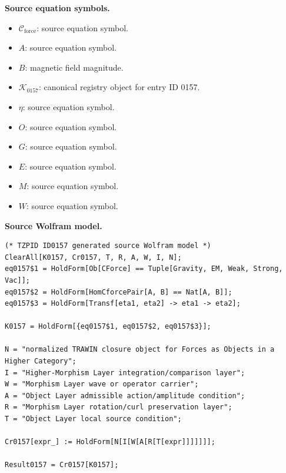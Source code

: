 \begin{minipage}[t]{0.49\linewidth}
\begingroup
\small
\raggedright
\textbf{Source equation symbols.}\par
\begin{itemize}[leftmargin=1.35em,itemsep=1pt,topsep=1pt,parsep=0pt]
    \item $\mathcal{C}_{\mathrm{force}}$: source equation symbol.
    \item $A$: source equation symbol.
    \item $B$: magnetic field magnitude.
    \item $\mathcal{K}_{0157}$: canonical registry object for entry ID 0157.
    \item $\eta$: source equation symbol.
    \item $O$: source equation symbol.
    \item $G$: source equation symbol.
    \item $E$: source equation symbol.
    \item $M$: source equation symbol.
    \item $W$: source equation symbol.
\end{itemize}
\endgroup
\end{minipage}\hfill
\begin{minipage}[t]{0.47\linewidth}
\begingroup
\scriptsize
\raggedright
\textbf{Source Wolfram model.}\par
\begin{Verbatim}[fontsize=\tiny,breaklines=true,breakanywhere=true]
(* TZPID ID0157 generated source Wolfram model *)
ClearAll[K0157, Cr0157, T, R, A, W, I, N];
eq0157$1 = HoldForm[Ob[CForce] == Tuple[Gravity, EM, Weak, Strong, Vac]];
eq0157$2 = HoldForm[HomCforcePair[A, B] == Nat[A, B]];
eq0157$3 = HoldForm[Transf[eta1, eta2] -> eta1 -> eta2];

K0157 = HoldForm[{eq0157$1, eq0157$2, eq0157$3}];

N = "normalized TRAWIN closure object for Forces as Objects in a Higher Category";
I = "Higher-Morphism Layer integration/comparison layer";
W = "Morphism Layer wave or operator carrier";
A = "Object Layer admissible action/amplitude condition";
R = "Morphism Layer rotation/curl preservation layer";
T = "Object Layer local source condition";

Cr0157[expr_] := HoldForm[N[I[W[A[R[T[expr]]]]]]];

Result0157 = Cr0157[K0157];
\end{Verbatim}
\endgroup
\end{minipage}

